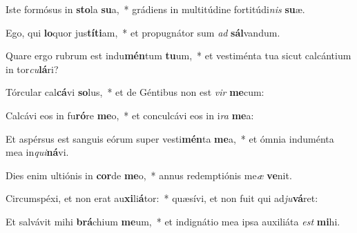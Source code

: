 \item Iste formósus in \textbf{sto}la \textbf{su}a,~* grádiens in multitúdine fortitúdi\textit{nis} \textbf{su}æ.
\item Ego, qui \textbf{lo}quor jus\textbf{tí}\textbf{ti}am,~* et propugnátor sum \textit{ad} \textbf{sál}vandum.
\item Quare ergo rubrum est indu\textbf{mén}tum \textbf{tu}um,~* et vestiménta tua sicut calcántium in tor\textit{cu}\textbf{lá}ri?
\item Tórcular cal\textbf{cá}vi \textbf{so}lus,~* et de Géntibus non est \textit{vir} \textbf{me}cum:
\item Calcávi eos in fu\textbf{ró}re \textbf{me}o,~* et conculcávi eos in i\textit{ra} \textbf{me}a:
\item Et aspérsus est sanguis eórum super vesti\textbf{mén}ta \textbf{me}a,~* et ómnia induménta mea in\textit{qui}\textbf{ná}vi.
\item Dies enim ultiónis in \textbf{cor}de \textbf{me}o,~* annus redemptiónis me\textit{æ} \textbf{ve}nit.
\item Circumspéxi, et non erat au\textbf{xi}li\textbf{á}tor:~* quæsívi, et non fuit qui ad\textit{ju}\textbf{vá}ret:
\item Et salvávit mihi \textbf{brá}chium \textbf{me}um,~* et indignátio mea ipsa auxiliáta \textit{est} \textbf{mi}hi.
